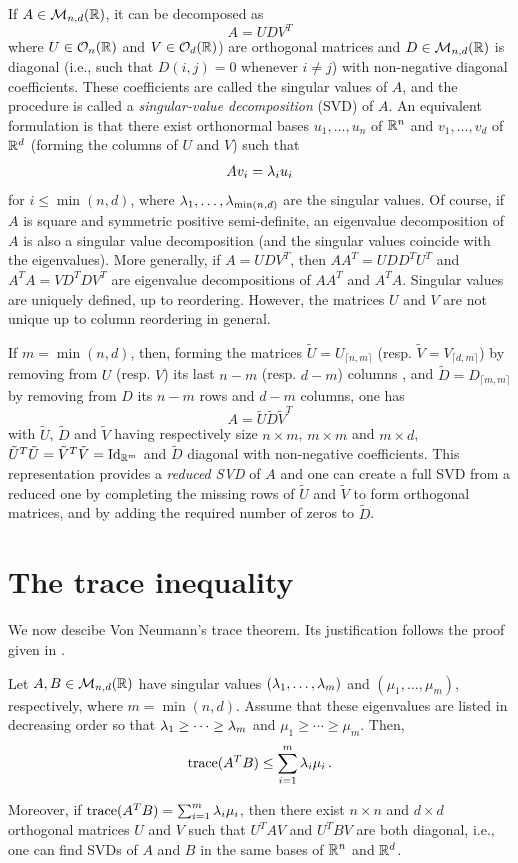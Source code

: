 If $A\in {\mathcal M}_{n,d}({\mathbb{R}})$, it can be decomposed as 
\[
A = UDV^T
\]
where $U \in {\mathcal O}_{n}({\mathbb{R}})$ and  $V\in {\mathcal O}_{d}({\mathbb{R}})$) are orthogonal matrices and $D\in {\mathcal M}_{n,d}({\mathbb{R}})$ is diagonal (i.e., such that $D(i,j) = 0$ whenever $i\neq j$) with non-negative diagonal coefficients. These coefficients are called the singular values of $A$, and the procedure is called a {\em singular-value decomposition} (SVD) of $A$. An equivalent formulation is that there exist orthonormal bases $u_1, \ldots, u_n$ of ${\mathbb{R}}^n$ and $v_1, \ldots, v_d$ of ${\mathbb{R}}^d$ (forming the columns of $U$ and $V$) such that
\[
Av_i = \lambda_i u_i
\]
for $i\leq \min(n,d)$, where $\lambda_1, \ldots, \lambda_{\min(n,d)}$ are the singular values. Of course, if $A$ is square and symmetric positive semi-definite, an eigenvalue decomposition of $A$  is also a singular value decomposition (and the singular values coincide with the eigenvalues). More generally, if  $A = UDV^T$, then $AA^T = UDD^TU^T$ and $A^TA = VD^TDV^T$ are eigenvalue decompositions of $AA^T$ and $A^TA$. Singular values are uniquely defined, up to reordering. However, the matrices $U$ and $V$ are not unique up to column reordering in general.

 If $m = \min(n, d)$, then, forming the matrices $\tilde U = U_{\lceil n,m\rceil}$ (resp. $\tilde V = V_{\lceil d, m\rceil}$) by removing from $U$ (resp. $V$) its last $n-m$ (resp. $d-m$) columns , and $\tilde D=D_{\lceil m,m\rceil}$  by removing from $D$ its $n-m$ rows and $d-m$ columns, one has
\[
A = \tilde U \tilde D \tilde V^T
\]
with $\tilde U$, $\tilde D$ and $\tilde V$ having respectively size $n\times m$, $m\times m$ and $m\times d$, $\tilde U^T \tilde U = \tilde V^T \tilde V = \Id[m]$ and $\tilde D$ diagonal with non-negative coefficients. This representation provides a {\em reduced SVD} of $A$ and one can create a full SVD from a reduced one by completing the missing rows of $\tilde U$ and $\tilde V$ to form orthogonal matrices, and by adding the required number of zeros to $\tilde D$.

\section{The trace inequality}

We now descibe Von Neumann's trace theorem. Its justification follows the proof given in \citet{mirsky1975trace}.
\begin{theorem}
\label{th:trace.ineq}
Let $A, B\in {\mathcal M}_{n,d}({\mathbb{R}})$ have  singular values $(\lambda_1, \ldots, \lambda_m)$ and $(\mu_1, \ldots, \mu_m)$, respectively,  where $m = \min(n,d)$. Assume that these eigenvalues are listed in decreasing order so that
$\lambda_1\geq \cdots\geq \lambda_m$ and $\mu_1\geq \cdots\geq \mu_m$. Then,
\begin{equation}
\label{eq:trace.ineq}
{\mathrm{trace}}(A^TB) \leq \sum_{i=1}^m \lambda_i\mu_i\,.
\end{equation}

Moreover, if ${\mathrm{trace}}(A^TB) = \sum_{i=1}^m \lambda_i\mu_i$, then there exist $n\times n$ and $d\times d$ orthogonal matrices $U$ and $V$ such that $U^TAV$ and $U^TBV$ are both diagonal, i.e., one can find SVDs of $A$ and $B$ in the same bases of ${\mathbb{R}}^n$ and ${\mathbb{R}}^d$.
\end{theorem}

